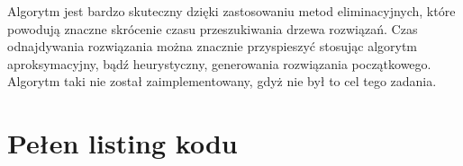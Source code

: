   Algorytm jest bardzo skuteczny dzięki zastosowaniu metod eliminacyjnych, które
  powodują znaczne skrócenie czasu przeszukiwania drzewa rozwiązań.
  Czas odnajdywania rozwiązania można znacznie przyspieszyć stosując algorytm
  aproksymacyjny, bądź heurystyczny, generowania rozwiązania początkowego.
  Algorytm taki nie został zaimplementowany, gdyż nie był to cel tego zadania.


\newpage
\appendix
\section{Pełen listing kodu} %
  \label{sec:listing}
  \singlespacing
  \inputminted{c}{../bb.c}


